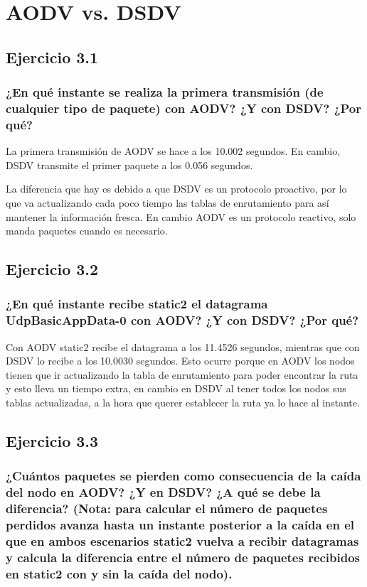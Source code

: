 \chapter{AODV vs. DSDV}
\label{chap:aodvdsdv}

\section{Ejercicio 3.1}

\subsection{¿En qué instante se realiza la primera transmisión (de cualquier tipo de paquete) con AODV? ¿Y con DSDV?
¿Por qué?}

La primera transmisión de AODV se hace a los 10.002 segundos. En cambio, DSDV transmite el primer paquete a los 0.056 segundos.

La diferencia que hay es debido a que DSDV es un protocolo proactivo, por lo que va actualizando cada poco tiempo las tablas de enrutamiento para así mantener la información fresca. En cambio AODV es un protocolo reactivo, solo manda paquetes cuando es necesario.

\section{Ejercicio 3.2}

\subsection{¿En qué instante recibe static2 el datagrama UdpBasicAppData-0 con AODV? ¿Y con DSDV? ¿Por qué?}

Con AODV static2 recibe el datagrama a los 11.4526 segundos, mientras que con DSDV lo recibe a los 10.0030 segundos. Esto ocurre porque en AODV los nodos tienen que ir actualizando la tabla de enrutamiento para poder encontrar la ruta y esto lleva un tiempo extra, en cambio en DSDV al tener todos los nodos sus tablas actualizadas, a la hora que querer establecer la ruta ya lo hace al instante.


\section{Ejercicio 3.3}

\subsection{¿Cuántos paquetes se pierden como consecuencia de la caída del nodo en AODV? ¿Y en DSDV? ¿A qué se
debe la diferencia? (Nota: para calcular el número de paquetes perdidos avanza hasta un instante posterior a la
caída en el que en ambos escenarios static2 vuelva a recibir datagramas y calcula la diferencia entre el número
de paquetes recibidos en static2 con y sin la caída del nodo).}

